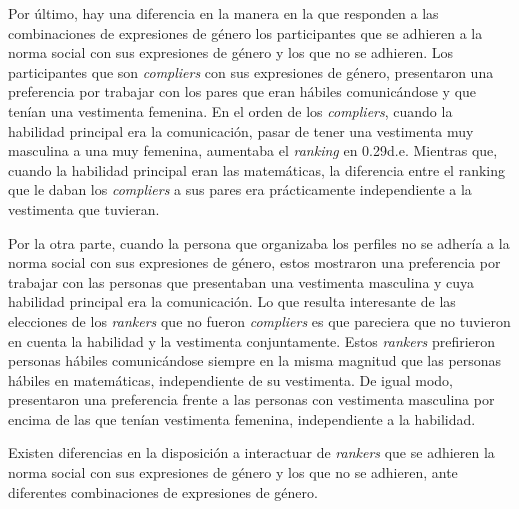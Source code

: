 Por último, hay una diferencia en la manera en la que responden a las combinaciones de expresiones de género los participantes que se adhieren a la norma social con sus expresiones de género y los que no se adhieren. Los participantes que son \textit{compliers} con sus expresiones de género, presentaron una preferencia por trabajar con los pares que eran hábiles comunicándose y que tenían una vestimenta femenina. En el orden de los \textit{compliers}, cuando la habilidad principal era la comunicación, pasar de tener una vestimenta muy masculina a una muy femenina, aumentaba el \textit{ranking} en 0.29d.e. Mientras que, cuando la habilidad principal eran las matemáticas, la diferencia entre el ranking que le daban los \textit{compliers} a sus pares era prácticamente independiente a la vestimenta que tuvieran.

Por la otra parte, cuando la persona que organizaba los perfiles no se adhería a la norma social con sus expresiones de género, estos mostraron una preferencia por trabajar con las personas que presentaban una vestimenta masculina y cuya habilidad principal era la comunicación. Lo que resulta interesante de las elecciones de los \textit{rankers} que no fueron \textit{compliers} es que pareciera que no tuvieron en cuenta la habilidad y la vestimenta conjuntamente. Estos \textit{rankers} prefirieron personas hábiles comunicándose siempre en la misma magnitud que las personas hábiles en matemáticas, independiente de su vestimenta. De igual modo, presentaron una preferencia frente a las personas con vestimenta masculina por encima de las que tenían vestimenta femenina, independiente a la habilidad. 
\begin{result}
Existen diferencias en la disposición a interactuar de \textit{rankers} que se adhieren la norma social con sus expresiones de género y los que no se adhieren, ante diferentes combinaciones de expresiones de género. 
\end{result}